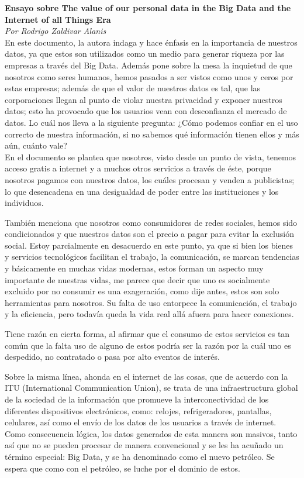 \documentclass[12pt]{report}
\begin{document}
\begin{enumerate}[label=\textbf{\arabic*.}, leftmargin=*]
\newpage
\textbf{Ensayo sobre The value of our personal data in
the Big Data and the Internet
of all Things Era}\\
\textit{Por Rodrigo Zaldivar Alanis}\\

En este documento, la autora indaga y hace énfasis en la importancia de nuestros datos, ya que estos son utilizados como un medio para generar riqueza por las empresas a través del Big Data. Además pone sobre la mesa la inquietud de que nosotros como seres humanos, hemos pasados a ser vistos como unos y ceros por estas empresas; además de que el valor de nuestros datos es tal, que las corporaciones llegan al punto de violar nuestra privacidad y exponer nuestros datos; esto ha provocado que los usuarios vean con desconfianza el mercado de datos. Lo cuál nos lleva a la siguiente pregunta: ¿Cómo podemos confiar en el uso correcto de nuestra información, si no sabemos qué información tienen ellos y más aún, cuánto vale?\\

En el documento se plantea que nosotros, visto desde un punto de vista, tenemos acceso gratis a internet y a muchos otros servicios a través de éste, porque nosotros pagamos con nuestros datos, los cuáles procesan y venden a publicistas; lo que desencadena en una desigualdad de poder entre las instituciones y los individuos.

También menciona que nosotros como consumidores de redes sociales, hemos sido condicionados y que nuestros datos son el precio a pagar para evitar la exclusión social. Estoy parcialmente en desacuerdo en este punto, ya que si bien los bienes y servicios tecnológicos facilitan el trabajo, la comunicación, se marcan tendencias y básicamente en muchas vidas modernas, estos forman un aspecto muy importante de nuestras vidas, me parece que decir que uno es socialmente excluido por no consumir  es una exageración, como dije antes, estos son solo herramientas para nosotros. Su falta de uso entorpece la comunicación, el trabajo y la eficiencia, pero todavía queda la vida real allá afuera para hacer conexiones.

Tiene razón en cierta forma, al afirmar que el consumo de estos servicios es tan común que la falta uso de alguno de estos podría ser la razón por la cuál uno es despedido, no contratado o pasa por alto eventos de interés.

Sobre la misma línea, ahonda en el internet de las cosas, que de acuerdo con la ITU (International Communication Union), se trata de una infraestructura global de la sociedad de la información que promueve la interconectividad de los diferentes dispositivos electrónicos, como: relojes, refrigeradores, pantallas, celulares, así como el envío de los datos de los usuarios a través de internet. Como consecuencia lógica, los datos generados de esta manera son masivos, tanto así que no se pueden procesar de manera convencional y se les ha acuñado un término especial: Big Data, y se ha denominado como el nuevo petróleo. Se espera que como con el petróleo, se luche por el dominio de estos.


\end{enumerate}
\end{document}
